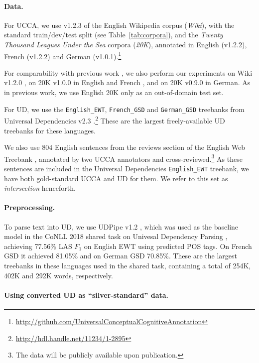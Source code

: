 \documentclass[11pt,a4paper]{article}
\begin{document}
\paragraph{Data.}

For UCCA, we use v1.2.3 of the English Wikipedia corpus (\textit{Wiki}),
with the standard train/dev/test split (see Table~\ref{tab:corpora}),
and the \textit{Twenty Thousand Leagues Under the Sea} corpora (\textit{20K}),
annotated in English (v1.2.2), French (v1.2.2)
and German (v1.0.1).\footnote{\url{http://github.com/UniversalConceptualCognitiveAnnotation}}

For comparability with previous work \cite{hershcovich2017a,hershcovich2018multitask},
we also perform our experiments on Wiki v1.2.0 \cite{abend2013universal},
on 20K v1.0.0 in English and French \cite{sulem2015conceptual},
and on 20K v0.9.0 in German.
As in previous work, we use English 20K only as an out-of-domain test set.

For UD, we use the \verb|English_EWT|, \verb|French_GSD| and \verb|German_GSD|
treebanks from Universal Dependencies v2.3
\cite{11234/1-2895}.\footnote{\url{http://hdl.handle.net/11234/1-2895}}
These are the largest freely-available UD treebanks for these languages.

We also use 804 English sentences from the reviews section of the English Web Treebank
\cite[EWT; ][]{bies2012english},
annotated by two UCCA annotators and
cross-reviewed.\footnote{The data will be publicly
available upon publication.}
As these sentences are included in the Universal Dependencies \verb|English_EWT| treebank,
we have both gold-standard UCCA and UD for them.
We refer to this set as \textit{intersection} henceforth.

\paragraph{Preprocessing.}

To parse text into UD, we use UDPipe v1.2 \cite{udpipe,udpipe:2017},
which was used as the baseline model in the CoNLL 2018 shared task on
Univesal Dependency Parsing \cite{zeman-EtAl:2018:K18-2},
achieving 77.56\% LAS $F_1$ on English EWT using predicted POS tags.
On French GSD it achieved 81.05\% and on German GSD 70.85\%.
These are the largest treebanks in these languages
used in the shared task, containing a total of 254K, 402K and 292K
words, respectively.

\paragraph{Using converted UD as ``silver-standard'' data.}
\end{document}
